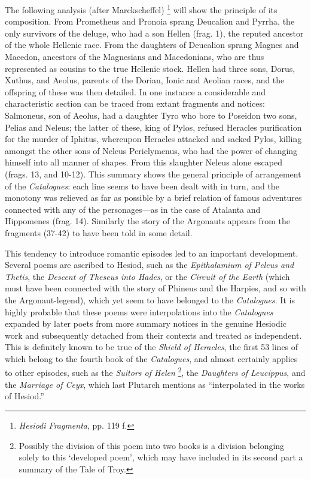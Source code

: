 The following analysis (after Marckscheffel) \footnote{\emph{Hesiodi Fragmenta},
pp. 119 f.} will show
the principle of its composition. From Prometheus and Pronoia sprang Deucalion
and Pyrrha, the only survivors of the deluge, who had a son Hellen (frag. 1),
the reputed ancestor of the whole Hellenic race. From the daughters of
Deucalion sprang Magnes and Macedon, ancestors of the Magnesians and
Macedonians, who are thus represented as cousins to the true Hellenic stock.
Hellen had three sons, Dorus, Xuthus, and Aeolus, parents of the Dorian, Ionic
and Aeolian races, and the offspring of these was then detailed. In one
instance a considerable and characteristic section can be traced from extant
fragments and notices: Salmoneus, son of Aeolus, had a daughter Tyro who bore
to Poseidon two sons, Pelias and Neleus; the latter of these, king of Pylos,
refused Heracles purification for the murder of Iphitus, whereupon Heracles
attacked and sacked Pylos, killing amongst the other sons of Neleus
Periclymenus, who had the power of changing himself into all manner of shapes.
From this slaughter Neleus alone escaped (frags. 13, and 10-12). This summary
shows the general principle of arrangement of the \emph{Catalogues}: each line
seems to have been dealt with in turn, and the monotony was relieved as far as
possible by a brief relation of famous adventures connected with any of the
personages—as in the case of Atalanta and Hippomenes (frag. 14).
Similarly the story of the Argonauts appears from the fragments (37-42) to have
been told in some detail.

This tendency to introduce romantic episodes led to an important development.
Several poems are ascribed to Hesiod, such as the \emph{Epithalamium of Peleus and
Thetis}, the \emph{Descent of Theseus into Hades}, or the \emph{Circuit of the
Earth} (which must have been connected with the story of Phineus and the
Harpies, and so with the Argonaut-legend), which yet seem to have belonged to
the \emph{Catalogues}. It is highly probable that these poems were
interpolations into the \emph{Catalogues} expanded by later poets from more
summary notices in the genuine Hesiodic work and subsequently detached from
their contexts and treated as independent. This is definitely known to be true
of the \emph{Shield of Heracles}, the first 53 lines of which belong to the
fourth book of the \emph{Catalogues}, and almost certainly applies to other
episodes, such as the \emph{Suitors of Helen} \footnote{Possibly the division of
this poem into two books is a division belonging solely to this
‘developed poem’, which may have included in its second part a
summary of the Tale of Troy.}, the
\emph{Daughters of Leucippus}, and the \emph{Marriage of Ceyx}, which last
Plutarch mentions as “interpolated in the works of Hesiod.”

